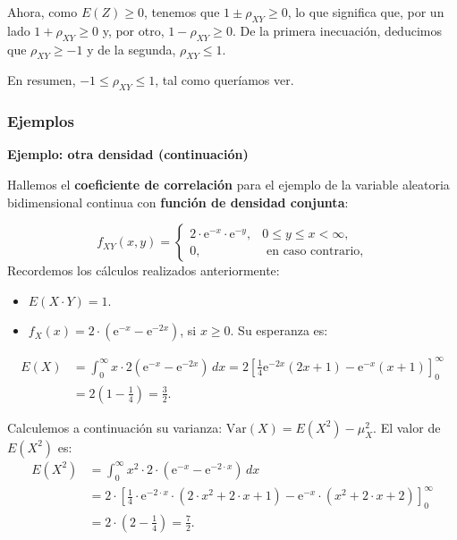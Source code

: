\documentclass[
  letterpaper,
  DIV=11,
  numbers=noendperiod]{scrreprt}
\begin{document}
Ahora, como \(E(Z)\geq 0\), tenemos que \(1\pm \rho_{XY}\geq 0\), lo que
significa que, por un lado \(1+\rho_{XY}\geq 0\) y, por otro,
\(1-\rho_{XY}\geq 0\). De la primera inecuación, deducimos que
\(\rho_{XY}\geq -1\) y de la segunda, \(\rho_{XY}\leq 1\).

En resumen, \(-1\leq\rho_{XY}\leq 1\), tal como queríamos ver.

\hypertarget{ejemplos-5}{%
\subsubsection{Ejemplos}\label{ejemplos-5}}

\textbf{Ejemplo: otra densidad (continuación)}

Hallemos el \textbf{coeficiente de correlación} para el ejemplo de la
variable aleatoria bidimensional continua con \textbf{función de
densidad conjunta}:

\[
f_{XY}(x,y)=\begin{cases}
2\cdot  \mathrm{e}^{-x}\cdot \mathrm{e}^{-y}, & 0\leq y\leq x < \infty,\\
0, & \mbox{ en caso contrario,}
\end{cases}
\] Recordemos los cálculos realizados anteriormente:

\begin{itemize}
\item
  \(E(X\cdot Y)=1.\)
\item
  \(f_X(x)=2\cdot \left(\mathrm{e}^{-x}-\mathrm{e}^{-2x}\right)\), si
  \(x\geq 0\). Su esperanza es:
\end{itemize}

\[
\begin{array}{rl}
E(X)&=\int_0^\infty x\cdot 2\left(\mathrm{e}^{-x}-\mathrm{e}^{-2x}\right)\, dx=2 \left[\frac{1}{4} \mathrm{e}^{-2 x} (2 x+1)-\mathrm{e}^{-x}(x+1)\right]_0^\infty \\
& = 2\left(1-\frac{1}{4}\right)=\frac{3}{2}.
\end{array}
\]

Calculemos a continuación su varianza:
\(\mathrm{Var}(X)=E\left(X^2\right)-\mu_X^2\). El valor de
\(E\left(X^2\right)\) es: \[
\begin{array}{rl}
E\left(X^2\right) & =\displaystyle \int_0^\infty x^2 \cdot 2\cdot \left(\mathrm{e}^{-x}-\mathrm{e}^{-2\cdot x}\right)\, dx\\
&=\displaystyle 2 \cdot  \left[\frac{1}{4} \cdot \mathrm{e}^{-2 \cdot x} \cdot  (2\cdot x^2+2\cdot x+1)- \mathrm{e}^{-x} \cdot (x^2+2\cdot x+2)\right]_0^\infty \\ & = 2\cdot \left(2-\frac{1}{4}\right)=\frac{7}{2}.
\end{array}
\]
\end{document}

